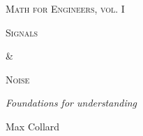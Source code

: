 \documentclass[11pt,letterpaper]{book}
\begin{document}
\frontmatter

\begin{titlepage}

    \centering
    {\scshape\Large Math for Engineers, vol. I \par}
    \vspace{4.0cm}
    {\scshape\huge Signals \par}
    \vspace{0.4cm}
    {\scshape\huge \& \par}
    \vspace{0.4cm}
    {\scshape\huge Noise \par}
    \vspace{1.0cm}
    {\Large\itshape Foundations for understanding \par}
    \vspace{6.0cm}
    {\Large Max Collard \par}

    \vfill

\end{titlepage}

\tableofcontents


\mainmatter




\backmatter

\end{document}
